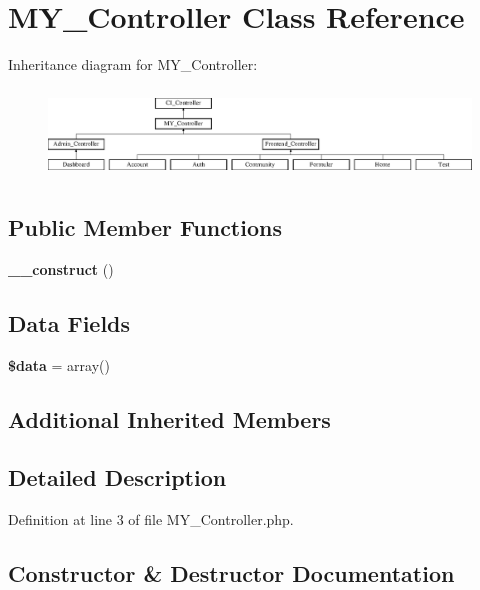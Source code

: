 \section{M\-Y\-\_\-\-Controller Class Reference}
\label{class_m_y___controller}
Inheritance diagram for M\-Y\-\_\-\-Controller\-:\begin{figure}[H]
\begin{center}
\leavevmode
\includegraphics[height=2.388060cm]{class_m_y___controller}
\end{center}
\end{figure}
\subsection*{Public Member Functions}
\begin{DoxyCompactItemize}
\item 
{\bf \-\_\-\-\_\-construct} ()
\end{DoxyCompactItemize}
\subsection*{Data Fields}
\begin{DoxyCompactItemize}
\item 
{\bf \$data} = array()
\end{DoxyCompactItemize}
\subsection*{Additional Inherited Members}


\subsection{Detailed Description}


Definition at line 3 of file M\-Y\-\_\-\-Controller.\-php.



\subsection{Constructor \& Destructor Documentation}
